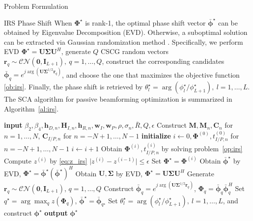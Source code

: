 \documentclass[journal]{IEEEtran}
\begin{document}
\begin{section}{Problem Formulation}
\begin{subsection}{IRS Phase Shift}
			When $\boldsymbol{\Phi}^{\star}$ is rank-\num{1}, the optimal phase shift vector $\bar{\boldsymbol{\phi}}^\star$ can be obtained by Eigenvalue Decomposition (EVD). Otherwise, a suboptimal solution can be extracted via Gaussian randomization method \cite{Huang2010}. Specifically, we perform EVD $\boldsymbol{\Phi}^{\star}=\boldsymbol{U}\boldsymbol{\Sigma}\boldsymbol{U}^H$, generate $Q$ CSCG random vectors $\boldsymbol{r}_q \sim \mathcal{CN}(\boldsymbol{0},\boldsymbol{I}_{L+1}),\ q=1,\dots,Q$, construct the corresponding candidates $\bar{\boldsymbol{\phi}}_q=e^{j\arg\left(\boldsymbol{U}\boldsymbol{\Sigma}^{1/2}\boldsymbol{r}_q\right)}$, and choose the one that maximizes the objective function \ref{ob:irs}. Finally, the phase shift is retrieved by $\theta_l^{\star}=\arg(\phi_l^\star/\phi_{L+1}^\star), \ l=1,\dots,L$. The SCA algorithm for passive beamforming optimization is summarized in Algorithm~\ref{al:irs}.
			\begin{algorithm}[!t]
				\caption{SCA: IRS Phase Shift.}
				\label{al:irs}
				\begin{algorithmic}[1]
					\State \textbf{input} $\beta_2,\beta_4,\boldsymbol{h}_{D,n},\boldsymbol{H}_{I,n},\boldsymbol{h}_{R,n},\boldsymbol{w}_I,\boldsymbol{w}_P,\rho,\sigma_n,\bar{R},Q,\epsilon$
					\State Construct $\boldsymbol{M},\boldsymbol{M}_n,\boldsymbol{C}_{n}$ for $n=1,\dots,N$, $\boldsymbol{C}_{I/P,n}$ for $n=-N+1,\dots,N-1$
					\State \textbf{initialize} $i \gets 0,\boldsymbol{\Phi}^{(0)},t_{I/P,n}^{(0)}$ for $n=-N+1,\dots,N-1$
					\Repeat
						\State $i \gets i + 1$
						\State Obtain $\boldsymbol{\Phi}^{(i)}, t_{I/P,n}^{(i)}$ by solving problem~\ref{op:irs}
						\State Compute $z^{(i)}$ by \ref{eq:z_irs}
					\Until $\lvert z^{(i)}-z^{(i-1)} \rvert \le \epsilon$
					\State Set $\boldsymbol{\Phi}^{\star}=\boldsymbol{\Phi}^{(i)}$
						\State Obtain $\bar{\boldsymbol{\phi}}^\star$ by EVD, $\boldsymbol{\Phi}^{\star}=\bar{\boldsymbol{\phi}}^\star(\bar{\boldsymbol{\phi}}^\star)^H$
					\Else
						\State Obtain $\boldsymbol{U},\boldsymbol{\Sigma}$ by EVD, $\boldsymbol{\Phi}^{\star}=\boldsymbol{U}\boldsymbol{\Sigma}\boldsymbol{U}^H$
						\State Generate $\boldsymbol{r}_q \sim \mathcal{CN}(\boldsymbol{0},\boldsymbol{I}_{L+1})$, $q=1,\dots,Q$
						\State Construct $\bar{\boldsymbol{\phi}}_q=e^{j\arg\left(\boldsymbol{U}\boldsymbol{\Sigma}^{1/2}\boldsymbol{r}_q\right)}$, $\boldsymbol{\Phi}_q=\bar{\boldsymbol{\phi}}_q\bar{\boldsymbol{\phi}}_q^H$
						\State Set $q^{\star}=\arg\max_q{z(\boldsymbol{\Phi}_q)}$, $\bar{\boldsymbol{\phi}}^\star=\bar{\boldsymbol{\phi}}_{q^{\star}}$
					\EndIf
					\State Set $\theta_l^\star=\arg(\phi_l^\star/\phi_{L+1}^\star), \ l=1,\dots,L$, and construct $\boldsymbol{\phi}^{\star}$
					\State \textbf{output} $\boldsymbol{\phi}^{\star}$
				\end{algorithmic}
			\end{algorithm}
		\end{subsection}



\end{section}
\end{document}
